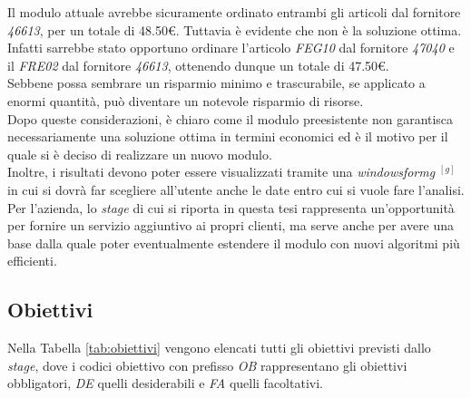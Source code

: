 \noindent Il modulo attuale avrebbe sicuramente ordinato entrambi gli articoli dal fornitore \textit{46613},
per un totale di 48.50€. Tuttavia è evidente che non è la soluzione ottima.
Infatti sarrebbe stato opportuno ordinare l'articolo \textit{FEG10} dal fornitore \textit{47040} e il
\textit{FRE02} dal fornitore \textit{46613}, ottenendo dunque un totale di 47.50€.\\
Sebbene possa sembrare un risparmio minimo e trascurabile, se applicato a enormi quantità, può
diventare un notevole risparmio di risorse.\\

\noindent Dopo queste considerazioni, è chiaro come il modulo preesistente non garantisca necessariamente una soluzione ottima in termini economici ed è il motivo per il quale
si è deciso di realizzare un nuovo modulo.\\

\noindent Inoltre, i risultati devono poter essere visualizzati tramite una \textit{\gls{windowsformg}} $^{[g]}$ in cui si dovrà far scegliere all'utente
anche le date entro cui si vuole fare l'analisi.\\

\noindent Per l'azienda, lo \textit{stage} di cui si riporta in questa tesi rappresenta un'opportunità per fornire un servizio aggiuntivo ai propri clienti, ma serve anche per avere una base
dalla quale poter eventualmente estendere il modulo con nuovi algoritmi più efficienti.
\newpage
\subsection{Obiettivi}
\label{sec:obiettivi}
\noindent Nella Tabella \ref{tab:obiettivi} vengono elencati tutti gli obiettivi previsti dallo \textit{stage}, dove
i codici obiettivo con prefisso \textit{OB} rappresentano gli obiettivi obbligatori, \textit{DE} quelli desiderabili
e \textit{FA} quelli facoltativi.

\renewcommand{\arraystretch}{1.55}

